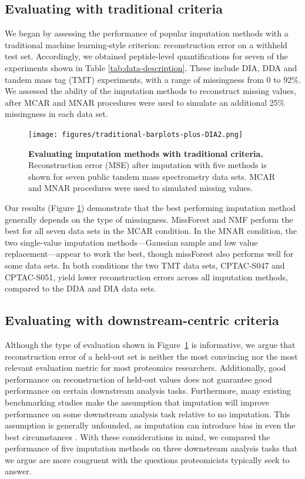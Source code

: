\documentclass{article}
\begin{document}
\subsection{Evaluating with traditional criteria}

We began by assessing the performance of popular imputation methods with a traditional machine learning-style criterion: reconstruction error on a withheld test set. Accordingly, we obtained peptide-level quantifications for seven of the experiments shown in Table \ref{tab:data-description}. These include DIA, DDA and tandem mass tag (TMT) experiments, with a range of missingness from 0 to 92\%. We assessed the ability of the imputation methods to reconstruct missing values, after MCAR and MNAR procedures were used to simulate an additional 25\% missingness in each data set.

\begin{figure}
  \centering
  \texttt{[image: figures/traditional-barplots-plus-DIA2.png]}
  \caption{{\bf Evaluating imputation methods with traditional criteria.} 
  Reconstruction error (MSE) after imputation with five methods is shown for seven public tandem mass spectrometry data sets. MCAR and MNAR procedures were used to simulated missing values.}
  \label{fig:traditional-eval}
\end{figure}

Our results (Figure \ref{fig:traditional-eval}) demonstrate that the best performing imputation method generally depends on the type of missingness. MissForest and NMF perform the best for all seven data sets in the MCAR condition. In the MNAR condition, the two single-value imputation methods---Gaussian sample and low value replacement---appear to work the best, though missForest also performs well for some data sets. In both conditions the two TMT data sets, CPTAC-S047 and CPTAC-S051, yield lower reconstruction errors across all imputation methods, compared to the DDA and DIA data sets. 

\subsection{Evaluating with downstream-centric criteria}

Although the type of evaluation shown in Figure~\ref{fig:traditional-eval} is informative, we argue that reconstruction error of a held-out set is neither the most convincing nor the most relevant evaluation metric for most proteomics researchers. Additionally, good performance on reconstruction of held-out values does not guarantee good performance on certain downstream analysis tasks. Furthermore, many existing benchmarking studies make the assumption that imputation will improve performance on some downstream analysis task relative to no imputation. This assumption is generally unfounded, as imputation can introduce bias in even the best circumstances \cite{scRNAseq-false-signals, sc-impute-gene-networks}. With these considerations in mind, we compared the performance of five imputation methods on three downstream analysis tasks that we argue are more congruent with the questions proteomicists typically seek to answer.
\end{document}
